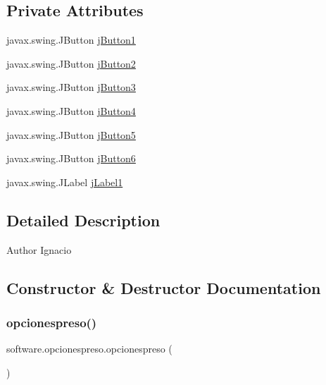 \subsection*{Private Attributes}
\begin{DoxyCompactItemize}
\item 
javax.\+swing.\+J\+Button \mbox{\hyperlink{classsoftware_1_1opcionespreso_aa05af6874bd2369082e5aacf3b2bb50d}{j\+Button1}}
\item 
javax.\+swing.\+J\+Button \mbox{\hyperlink{classsoftware_1_1opcionespreso_a965bd56cdf43ac702899aff6b882fe53}{j\+Button2}}
\item 
javax.\+swing.\+J\+Button \mbox{\hyperlink{classsoftware_1_1opcionespreso_adf21589322eda1079c8f08265ec86a83}{j\+Button3}}
\item 
javax.\+swing.\+J\+Button \mbox{\hyperlink{classsoftware_1_1opcionespreso_a7fe878181ce5171fa1a59956d589d900}{j\+Button4}}
\item 
javax.\+swing.\+J\+Button \mbox{\hyperlink{classsoftware_1_1opcionespreso_a5948e430eec5399935a10ca8300296df}{j\+Button5}}
\item 
javax.\+swing.\+J\+Button \mbox{\hyperlink{classsoftware_1_1opcionespreso_af727e23b9f6fb213484737b6fb3a63d9}{j\+Button6}}
\item 
javax.\+swing.\+J\+Label \mbox{\hyperlink{classsoftware_1_1opcionespreso_a61c0885ed9ce31eca799d9b0507589b7}{j\+Label1}}
\end{DoxyCompactItemize}


\subsection{Detailed Description}
\begin{DoxyAuthor}{Author}
Ignacio 
\end{DoxyAuthor}


\subsection{Constructor \& Destructor Documentation}
\mbox{\label{classsoftware_1_1opcionespreso_a7a3faf552876ca7ad20b768f262bee92}} 
\subsubsection{\texorpdfstring{opcionespreso()}{opcionespreso()}}
{\footnotesize\ttfamily software.\+opcionespreso.\+opcionespreso (\begin{DoxyParamCaption}{ }\end{DoxyParamCaption})\hspace{0.3cm}{\ttfamily [inline]}}


